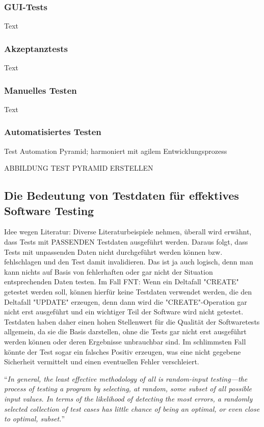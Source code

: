\subsubsection*{GUI-Tests}\label{subsubsec:guitests}
Text

\subsubsection*{Akzeptanztests}\label{subsubsec:akzeptanztests}
Text

\subsubsection*{Manuelles Testen}\label{subsubsec:manuelltest}
Text

\subsubsection*{Automatisiertes Testen}\label{subsubsec:autotest}
Test Automation Pyramid; harmoniert mit agilem Entwicklungsprozess \cite{contan:2018}

ABBILDUNG TEST PYRAMID ERSTELLEN

\subsection{Die Bedeutung von Testdaten für effektives Software Testing}\label{subsec:testdaten}
Idee wegen Literatur: Diverse Literaturbeispiele nehmen, überall wird erwähnt, dass Tests mit PASSENDEN Testdaten ausgeführt werden. Daraus folgt, dass Tests mit unpassenden Daten nicht durchgeführt werden können bzw. fehlschlagen und den Test damit invalidieren. Das ist ja auch logisch, denn man kann nichts auf Basis von fehlerhaften oder gar nicht der Situation entsprechenden Daten testen. Im Fall FNT: Wenn ein Deltafall "CREATE" getestet werden soll, können hierfür keine Testdaten verwendet werden, die den Deltafall "UPDATE" erzeugen, denn dann wird die "CREATE"-Operation gar nicht erst ausgeführt und ein wichtiger Teil der Software wird nicht getestet. Testdaten haben daher einen hohen Stellenwert für die Qualität der Softwaretests allgemein, da sie die Basis darstellen, ohne die Tests gar nicht erst ausgeführt werden können oder deren Ergebnisse unbrauchbar sind. Im schlimmsten Fall könnte der Test sogar ein falsches Positiv erzeugen, was eine nicht gegebene Sicherheit vermittelt und einen eventuellen Fehler verschleiert.

\enquote{\textit{In general, the least effective methodology of all is random-input
testing—the process of testing a program by selecting, at random, some
subset of all possible input values. In terms of the likelihood of detecting
the most errors, a randomly selected collection of test cases has little
chance of being an optimal, or even close to optimal, subset.}} \cite[S. 41]{myers:2011}